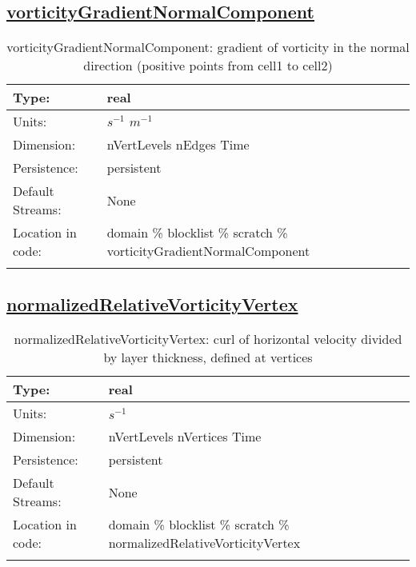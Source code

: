 \subsection[vorticityGradientNormalComponent]{\hyperref[sec:var_tab_scratch]{vorticityGradientNormalComponent}}
\label{subsec:var_sec_scratch_vorticityGradientNormalComponent}
\begin{center}
\begin{longtable}{| p{2.0in} | p{4.0in} |}
        \hline 
        Type: & real \\
        \hline 
        Units: & $s^{-1}$ $m^{-1}$ \\
        \hline 
        Dimension: & nVertLevels nEdges Time \\
        \hline 
        Persistence: & persistent \\
        \hline 
		 Default Streams: & None \\
        \hline 
		 Location in code: & domain \% blocklist \% scratch \% vorticityGradientNormalComponent \\
		 \hline 
    \caption{vorticityGradientNormalComponent: gradient of vorticity in the normal direction (positive points from cell1 to cell2)}
\end{longtable}
\end{center}
\subsection[normalizedRelativeVorticityVertex]{\hyperref[sec:var_tab_scratch]{normalizedRelativeVorticityVertex}}
\label{subsec:var_sec_scratch_normalizedRelativeVorticityVertex}
\begin{center}
\begin{longtable}{| p{2.0in} | p{4.0in} |}
        \hline 
        Type: & real \\
        \hline 
        Units: & $s^{-1}$ \\
        \hline 
        Dimension: & nVertLevels nVertices Time \\
        \hline 
        Persistence: & persistent \\
        \hline 
		 Default Streams: & None \\
        \hline 
		 Location in code: & domain \% blocklist \% scratch \% normalizedRelativeVorticityVertex \\
		 \hline 
    \caption{normalizedRelativeVorticityVertex: curl of horizontal velocity divided by layer thickness, defined at vertices}
\end{longtable}
\end{center}
